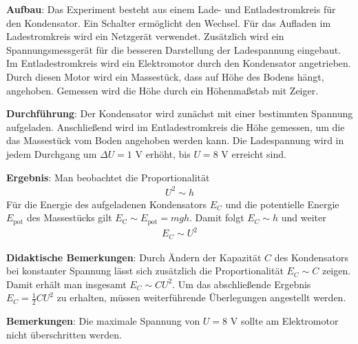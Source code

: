 \documentclass[../main.tex]{subfiles}
\begin{document}
\begin{tcolorbox}
    \vspace{0.4cm}
    \textbf{Aufbau}: Das Experiment besteht aus einem Lade- und Entladestromkreis für den Kondensator. Ein Schalter ermöglicht den Wechsel. Für das Aufladen im Ladestromkreis wird ein Netzgerät verwendet. Zusätzlich wird ein Spannungsmessgerät für die besseren Darstellung der Ladespannung eingebaut. Im Entladestromkreis wird ein Elektromotor durch den Kondensator angetrieben. Durch diesen Motor wird ein Massestück, dass auf Höhe des Bodens hängt, angehoben. Gemessen wird die Höhe durch ein Höhenmaßstab mit Zeiger.   
    
    \vspace{0.4cm}
    \textbf{Durchführung}: Der Kondensator wird zunächst mit einer bestimmten Spannung aufgeladen. Anschließend wird im Entladestromkreis die Höhe gemessen, um die das Massestück vom Boden angehoben werden kann. Die Ladespannung wird in jedem Durchgang um $\Delta U=1$ V erhöht, bis $U=8$ V erreicht sind.

    \vspace{0.4cm}
    \textbf{Ergebnis}: Man beobachtet die Proportionalität
    \begin{align*}
        U^2 \sim h
    \end{align*}
    Für die Energie des aufgeladenen Kondensators $E_C$ und die potentielle Energie $E_{\text{pot}}$ des Massestücks gilt $E_{\text{C}} \sim E_{\text{pot}}=mgh$. Damit folgt $E_C \sim h$ und weiter
    \begin{align*}
        E_C \sim U^2
    \end{align*}
    
\vspace{0.4cm}
    \textbf{Didaktische Bemerkungen}: Durch Ändern der Kapazität $C$ des Kondensators bei konstanter Spannung lässt sich zusätzlich die Proportionalität $E_C \sim C$ zeigen. Damit erhält man insgesamt $E_C \sim CU^2$. Um das abschließende Ergebnis $E_C=\frac{1}{2}CU^2$ zu erhalten, müssen weiterführende Überlegungen angestellt werden. 

    \vspace{0.4cm}
    \textbf{Bemerkungen}: Die maximale Spannung von $U=8$ V sollte am Elektromotor nicht überschritten werden. 
\end{tcolorbox}
\end{document}
